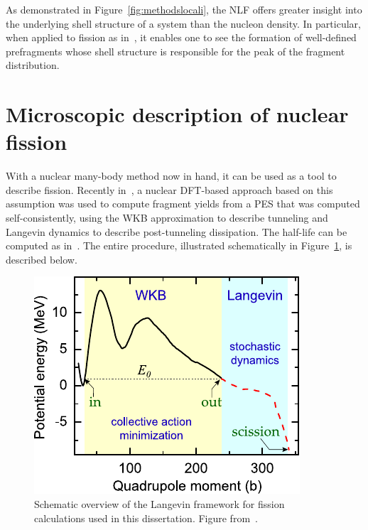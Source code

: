 As demonstrated in Figure~\ref{fig:methodslocali}, the NLF offers greater insight into the underlying shell structure of a system than the nucleon density. In particular, when applied to fission as in~\cite{Sadhukhan2017}, it enables one to see the formation of well-defined prefragments whose shell structure is responsible for the peak of the fragment distribution.


\section{Microscopic description of nuclear fission}\label{sect:fissionmethod}
With a nuclear many-body method now in hand, it can be used as a tool to describe fission. Recently in~\cite{Sadhukhan2016}, a nuclear DFT-based approach based on this assumption was used to compute fragment yields from a PES that was computed self-consistently, using the WKB approximation to describe tunneling and Langevin dynamics to describe post-tunneling dissipation. The half-life can be computed as in~\cite{Sadhukhan2013}. The entire procedure, illustrated schematically in Figure~\ref{fig:methodsoverview}, is described below.

\begin{figure}
	\centering
	\includegraphics[width=0.5\linewidth]{TeX_files/methods_overview}
	\caption[Schematic overview of the Langevin framework for fission calculations used in this dissertation]{Schematic overview of the Langevin framework for fission calculations used in this dissertation. Figure from~\cite{Sadhukhan2016}.}
	\label{fig:methodsoverview}
\end{figure}

